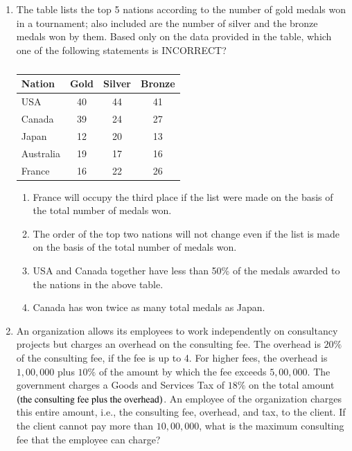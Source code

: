 \documentclass[journal,12pt,onecolumn]{IEEEtran}
\theoremstyle{remark}
\begin{document}
\begin{enumerate}
\item The table lists the top 5 nations according to the number of gold medals won in a tournament; also included are the number of silver and the bronze medals won by them. Based only on the data provided in the table, which one of the following statements is INCORRECT?
\begin{table}[h]
\centering
\begin{tabular}{|l|c|c|c|}
\hline
\textbf{Nation} & \textbf{Gold} & \textbf{Silver} & \textbf{Bronze} \\ \hline
USA & 40 & 44 & 41 \\
Canada & 39 & 24 & 27 \\
Japan & 12 & 20 & 13 \\
Australia & 19 & 17 & 16 \\
France & 16 & 22 & 26 \\ \hline
\end{tabular}
\caption*{}
\label{tab:q9}
\end{table}

\hfill{}

\begin{enumerate}
\item France will occupy the third place if the list were made on the basis of the total number of medals won.
\item The order of the top two nations will not change even if the list is made on the basis of the total number of medals won.
\item USA and Canada together have less than 50\% of the medals awarded to the nations in the above table.
\item Canada has won twice as many total medals as Japan.
\end{enumerate}

\item An organization allows its employees to work independently on consultancy projects but charges an overhead on the consulting fee. The overhead is $20\%$ of the consulting fee, if the fee is up to 4. For higher fees, the overhead is $1,00,000$ plus $10\%$ of the amount by which the fee exceeds $5,00,000$. The government charges a Goods and Services Tax of $18\%$ on the total amount $\left(\text{the consulting fee plus the overhead}\right)$. An employee of the organization charges this entire amount, i.e., the consulting fee, overhead, and tax, to the client. If the client cannot pay more than $10,00,000$, what is the maximum consulting fee that the employee can charge?


\end{enumerate}
\end{document}

